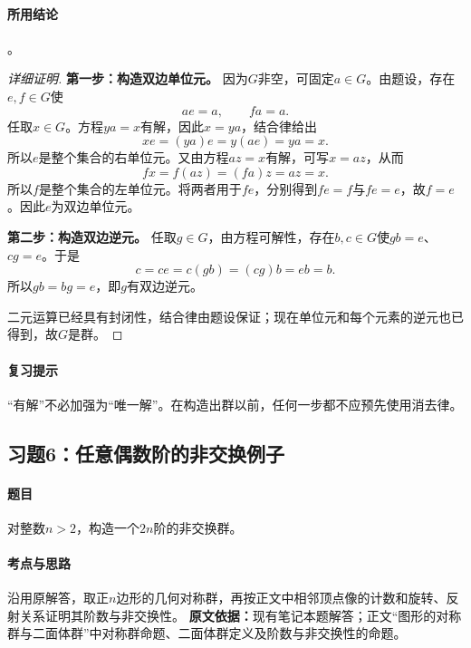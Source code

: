 \paragraph{所用结论}
。
\begin{proof}[详细证明]
\textbf{第一步：构造双边单位元。}
因为$G$非空，可固定$a\in G$。由题设，存在$e,f\in G$使
\[
ae=a,\qquad fa=a.
\]
任取$x\in G$。方程$ya=x$有解，因此$x=ya$，结合律给出
\[
xe=(ya)e=y(ae)=ya=x.
\]
所以$e$是整个集合的右单位元。又由方程$az=x$有解，可写$x=az$，从而
\[
fx=f(az)=(fa)z=az=x.
\]
所以$f$是整个集合的左单位元。将两者用于$fe$，分别得到$fe=f$与$fe=e$，故$f=e$。因此$e$为双边单位元。

\textbf{第二步：构造双边逆元。}
任取$g\in G$，由方程可解性，存在$b,c\in G$使$gb=e$、$cg=e$。于是
\[
c=ce=c(gb)=(cg)b=eb=b.
\]
所以$gb=bg=e$，即$g$有双边逆元。

二元运算已经具有封闭性，结合律由题设保证；现在单位元和每个元素的逆元也已得到，故$G$是群。
\end{proof}
\paragraph{复习提示}
“有解”不必加强为“唯一解”。在构造出群以前，任何一步都不应预先使用消去律。

\subsection{习题6：任意偶数阶的非交换例子}
\paragraph{题目}
对整数$n>2$，构造一个$2n$阶的非交换群。
\paragraph{考点与思路}
沿用原解答，取正$n$边形的几何对称群，再按正文中相邻顶点像的计数和旋转、反射关系证明其阶数与非交换性。
\textbf{原文依据：}现有笔记本题解答；正文“图形的对称群与二面体群”中对称群命题、二面体群定义及阶数与非交换性的命题。

